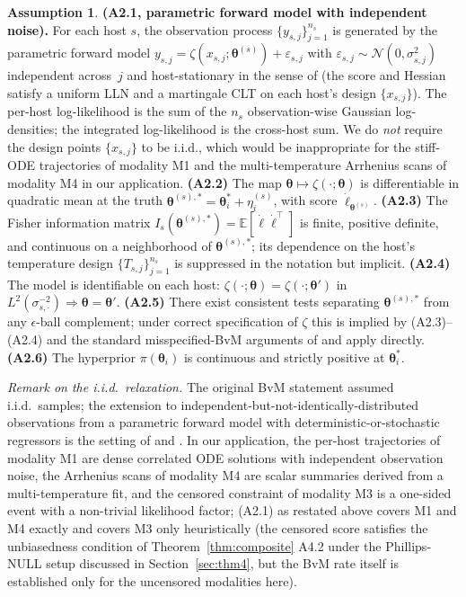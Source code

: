 \documentclass[12pt]{article}
\theoremstyle{plain}
\theoremstyle{definition}
\newtheorem{assumption}{Assumption}
\theoremstyle{remark}
\newcommand{\E}{\mathbb{E}}
\begin{document}
\begin{assumption}\label{ass:thm2}
\textbf{(A2.1, parametric forward model with independent noise).}  For each
host $s$, the observation process $\{y_{s,j}\}_{j=1}^{n_s}$ is generated by
the parametric forward model
$y_{s,j}=\zeta(x_{s,j};\boldsymbol\theta^{(s)})+\varepsilon_{s,j}$ with
$\varepsilon_{s,j}\sim\mathcal{N}(0,\sigma_{s,j}^2)$ independent across~$j$
and host-stationary in the sense of \citet[\S 3]{KleijnVdVaart2012} (the
score and Hessian satisfy a uniform LLN and a martingale CLT on each host's
design $\{x_{s,j}\}$).  The per-host log-likelihood is the sum of the $n_s$
observation-wise Gaussian log-densities; the integrated log-likelihood is
the cross-host sum.  We do \emph{not} require the design points
$\{x_{s,j}\}$ to be i.i.d., which would be inappropriate for the stiff-ODE
trajectories of modality M1 and the multi-temperature Arrhenius scans of
modality M4 in our application.
\textbf{(A2.2)} The map $\boldsymbol\theta\mapsto\zeta(\cdot;\boldsymbol\theta)$
is differentiable in quadratic mean at the truth
$\boldsymbol\theta^{(s),*}=\boldsymbol\theta_i^*+\eta_i^{(s)}$, with
score $\dot\ell_{\boldsymbol\theta^{(s)}}$.
\textbf{(A2.3)} The Fisher information matrix $I_s(\boldsymbol\theta^{(s),*})
=\E[\dot\ell\dot\ell^\top]$ is finite, positive definite, and continuous
on a neighborhood of $\boldsymbol\theta^{(s),*}$; its dependence on the
host's temperature design $\{T_{s,j}\}_{j=1}^{n_s}$ is suppressed in the
notation but implicit.
\textbf{(A2.4)} The model is identifiable on each host:
$\zeta(\cdot;\boldsymbol\theta)=\zeta(\cdot;\boldsymbol\theta')$ in
$L^2(\sigma_{s,\cdot}^{-2})\Rightarrow\boldsymbol\theta=\boldsymbol\theta'$.
\textbf{(A2.5)} There exist consistent tests
\citep[Lemma~10.2]{vdVaart1998} separating $\boldsymbol\theta^{(s),*}$
from any $\epsilon$-ball complement; under correct specification of $\zeta$
this is implied by (A2.3)--(A2.4) and the standard misspecified-BvM
arguments of \citet{KleijnVdVaart2012} and \citet{CastilloNickl2014} apply
directly.
\textbf{(A2.6)} The hyperprior $\pi(\boldsymbol\theta_i)$ is continuous
and strictly positive at $\boldsymbol\theta_i^*$.
\end{assumption}

\noindent\emph{Remark on the i.i.d.\ relaxation.}  The original
\citet[Theorem~10.1]{vdVaart1998} BvM statement assumed i.i.d.~samples; the
extension to independent-but-not-identically-distributed observations from a
parametric forward model with deterministic-or-stochastic regressors is the
setting of \citet{KleijnVdVaart2012} and \citet{CastilloNickl2014}.  In our
application, the per-host trajectories of modality M1 are dense correlated
ODE solutions with independent observation noise, the Arrhenius scans of
modality M4 are scalar summaries derived from a multi-temperature fit, and
the censored constraint of modality M3 is a one-sided event with a
non-trivial likelihood factor; (A2.1) as restated above covers M1 and M4
exactly and covers M3 only heuristically (the censored score satisfies the
unbiasedness condition of Theorem~\ref{thm:composite} A4.2 under the
Phillips-NULL setup discussed in Section~\ref{sec:thm4}, but the BvM rate
itself is established only for the uncensored modalities here).
\end{document}
